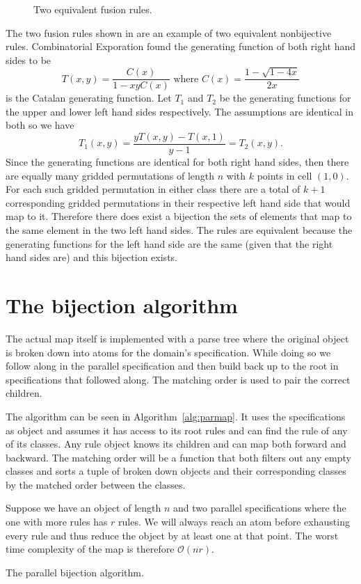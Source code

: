 \begin{figure}[ht!]
    \centering
    
    \caption{Two equivalent fusion rules.}
    \label{fig:fuseq}
\end{figure}

The two fusion rules shown in  are an example of two equivalent nonbijective rules.  Combinatorial Exporation found the generating function of both right hand sides to be
\[
    T(x,y) = \frac{C(x)}{1-xyC(x)} \text{ where } C(x) = \frac{1-\sqrt{1-4x}}{2x}
\]
is the Catalan generating function. Let $T_1$ and $T_2$ be the generating functions for the upper and lower left hand sides respectively. The assumptions are identical in both so we have
\[
    T_1(x,y) = \frac{yT(x,y)-T(x,1)}{y-1} = T_2(x,y).
\]
Since the generating functions are identical for both right hand sides, then there are equally many gridded permutations of length $n$ with $k$ points in cell $(1,0)$. For each such gridded permutation in either class there are a total of $k+1$ corresponding gridded permutations in their respective left hand side that would map to it. Therefore there does exist a bijection the sets of elements that map to the same element in the two left hand sides. The rules are equivalent because the generating functions for the left hand side are the same (given that the right hand sides are) and this bijection exists.

\section{The bijection algorithm}
The actual map itself is implemented with a parse tree where the original object is broken down into atoms for the domain's specification. While doing so we follow along in the parallel specification and then build back up to the root in specifications that followed along. The matching order is used to pair the correct children.

The algorithm can be seen in Algorithm~\ref{alg:parmap}. It uses the specifications as object and assumes it has access to its root rules and can find the rule of any of its classes. Any rule object knows its children and can map both forward and backward. The matching order will be a function that both filters out any empty classes and sorts a tuple of broken down objects and their corresponding classes by the matched order between the classes.

Suppose we have an object of length $n$ and two parallel specifications where the one with more rules has $r$ rules. We will always reach an atom before exhausting every rule and thus reduce the object by at least one at that point. The worst time complexity of the map is therefore $\mathcal{O}(nr)$.

\begin{algorithm}[ht!]

\caption{The parallel bijection algorithm.}
\label{alg:parmap}
\end{algorithm}